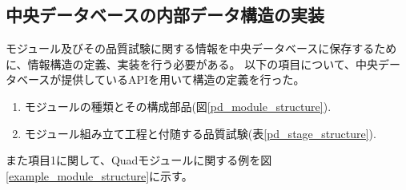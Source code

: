 \subsection{中央データベースの内部データ構造の実装}

モジュール及びその品質試験に関する情報を中央データベースに保存するために、情報構造の定義、実装を行う必要がある。
以下の項目について、中央データベースが提供しているAPIを用いて構造の定義を行った。
\begin{enumerate}
  \item モジュールの種類とその構成部品(図\ref{pd_module_structure}).
  \item モジュール組み立て工程と付随する品質試験(表\ref{pd_stage_structure}).
\end{enumerate}

また項目1に関して、Quadモジュールに関する例を図\ref{example_module_structure}に示す。

